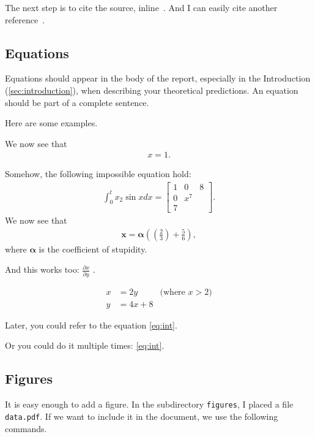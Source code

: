 \documentclass[10pt,twocolumn]{article}
\begin{document}
The next step is to cite the source, inline~\citep{Rowell1997}. And I can easily cite another reference~\citep{Ciesielski1997}.

\subsection{Equations}

Equations should appear in the body of the report, especially in the Introduction (\autoref{sec:introduction}), when describing your theoretical predictions. An equation should be part of a complete sentence.

Here are some examples.

We now see that
\begin{align}
	x = 1 .
\end{align}

Somehow, the following impossible equation hold:
\begin{align} \label{eq:int}
	\int_0^t x_2 \sin{x} dx = 
	\begin{bmatrix}
		1 & 0 & 8 \\
		0 & x^7 \\
		7 &
	\end{bmatrix} .
\end{align}
We now see that 
\begin{align}
	\bm{x} = \bm{\alpha} 
    \left( 
    	\left(
        	\frac{2}{3}
        \right) + 
        \frac{5}{6} 
    \right) , 
\end{align}
where $\bm{\alpha}$ is the coefficient of stupidity.

And this works too: $\frac{\partial x}{\partial y}$ .

\begin{subequations}
\begin{align*}
	x &= 2 y & \text{(where $x>2$)} \\
	y &= 4 x + 8 &
\end{align*}
\end{subequations}

Later, you could refer to the equation \autoref{eq:int}.

Or you could do it multiple times: \autoref{eq:int}.

\subsection{Figures}
It is easy enough to add a figure. In the subdirectory \texttt{figures}, I placed a file \texttt{data.pdf}. If we want to include it in the document, we use the following commands.
\end{document}
